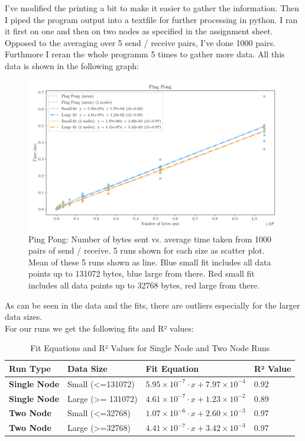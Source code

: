I've modified the printing a bit to make it easier to gather the information. 
Then I piped the program output into a textfile for further processing in python. I ran it first on one and then on two nodes as specified in the assignment sheet. Opposed to the averaging over 5 send / receive pairs, I've done 1000 pairs. Furthmore I reran the whole programm 5 times to gather more data. 
All this data is shown in the following graph: 
\begin{figure}[H]
    \centering
    \includegraphics[width=\textwidth]{../fig/lab0/pingPong.png}
    \caption{Ping Pong: Number of bytes sent vs. average time taken from 1000 pairs of send / receive. 5 runs shown for each size as scatter plot. Mean of these 5 runs shown as line. Blue small fit includes all data points up to 131072 bytes, blue large from there. Red small fit includes all data points up to 32768 bytes, red large from there.}
    \label{fig:pingpong}
\end{figure}
As can be seen in the data and the fits, there are outliers especially for the larger data sizes. \\
For our runs we get the following fits and R² values:
\begin{table}[h!]
    \centering
    \begin{tabular}{|l|l|l|l|}
        \hline
        \textbf{Run Type}   & \textbf{Data Size} & \textbf{Fit Equation}                                      & \textbf{R² Value} \\ \hline
        \textbf{Single Node} & Small (<=131072)             & $5.95 \times 10^{-7} \cdot x + 7.97 \times 10^{-4}$        & 0.92              \\ \hline
        \textbf{Single Node} & Large (>= 131072)& $4.61 \times 10^{-7} \cdot x + 1.23 \times 10^{-2}$        & 0.89              \\ \hline
        \textbf{Two Node}    & Small (<=32768)& $1.07 \times 10^{-6} \cdot x + 2.60 \times 10^{-3}$        & 0.97              \\ \hline
        \textbf{Two Node}    & Large (>=32768)   & $4.41 \times 10^{-7} \cdot x + 3.42 \times 10^{-3}$        & 0.97              \\ \hline
    \end{tabular}
    \caption{Fit Equations and R² Values for Single Node and Two Node Runs}
\end{table}

